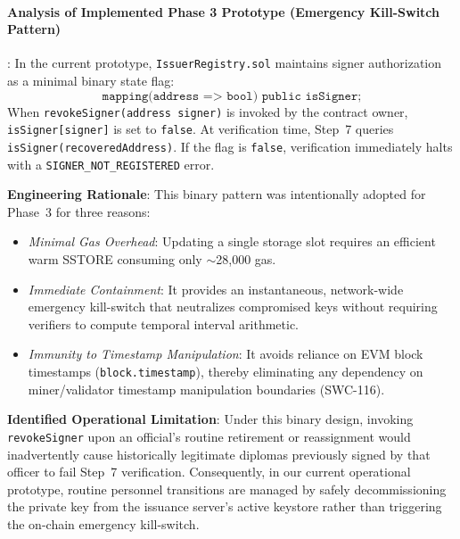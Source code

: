 \paragraph{Analysis of Implemented Phase 3 Prototype (Emergency Kill-Switch Pattern)}:
In the current prototype, \texttt{IssuerRegistry.sol} maintains signer authorization as a minimal binary state flag:
\begin{equation}
    \texttt{mapping(address => bool) public isSigner;}
\end{equation}
When \texttt{revokeSigner(address signer)} is invoked by the contract owner, \texttt{isSigner[signer]} is set to \texttt{false}. At verification time, Step~7 queries \texttt{isSigner(recoveredAddress)}. If the flag is \texttt{false}, verification immediately halts with a \texttt{SIGNER\_NOT\_REGISTERED} error.

\textbf{Engineering Rationale}: This binary pattern was intentionally adopted for Phase~3 for three reasons:
\begin{itemize}
    \item \textit{Minimal Gas Overhead}: Updating a single storage slot requires an efficient warm SSTORE consuming only $\sim$28,000 gas.
    \item \textit{Immediate Containment}: It provides an instantaneous, network-wide emergency kill-switch that neutralizes compromised keys without requiring verifiers to compute temporal interval arithmetic.
    \item \textit{Immunity to Timestamp Manipulation}: It avoids reliance on EVM block timestamps (\texttt{block.timestamp}), thereby eliminating any dependency on miner/validator timestamp manipulation boundaries (SWC-116).
\end{itemize}

\textbf{Identified Operational Limitation}: Under this binary design, invoking \texttt{revokeSigner} upon an official's routine retirement or reassignment would inadvertently cause historically legitimate diplomas previously signed by that officer to fail Step~7 verification. Consequently, in our current operational prototype, routine personnel transitions are managed by safely decommissioning the private key from the issuance server's active keystore rather than triggering the on-chain emergency kill-switch.

